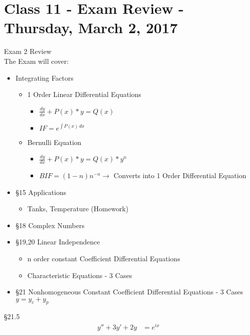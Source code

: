 \chapter{Class 11 - Exam Review - Thursday, March 2, 2017}
\begin{rvw}
Exam 2 Review\\
The Exam will cover:
\begin{itemize}
    \item Integrating Factors
    \begin{itemize}
        \item 1 Order Linear Differential Equations
        \begin{itemize}
            \item $\frac{dy}{dx} +P(x)*y=Q(x)$
            \item $IF = e^{\int P(x)\,dx}$
        \end{itemize}
        \item Bernulli Equation
        \begin{itemize}
            \item $\frac{dy}{dx}+P(x)*y=Q(x)*y^n$
            \item $BIF = (1-n)n^{-n} \rightarrow $ Converts into 1 Order Differential Equation
        \end{itemize}
    \end{itemize}
    \item \S 15 Applications
    \begin{itemize}
        \item Tanks, Temperature (Homework)
    \end{itemize}
    \item \S 18 Complex Numbers
    \item \S 19,20 Linear Independence
    \begin{itemize}
        \item n order constant Coefficient Differential Equations
        \item Characteristic Equations - 3 Cases
    \end{itemize}
    \item \S 21 Nonhomogeneous Constant Coefficient Differential Equations - 3 Cases $y=y_c+y_p$
\end{itemize}
\begin{ex}
\S 21.5\\
\begin{align*}
    y''+3y'+2y&=e^{ix}\\

\end{align*}
\end{ex}
\end{rvw}
